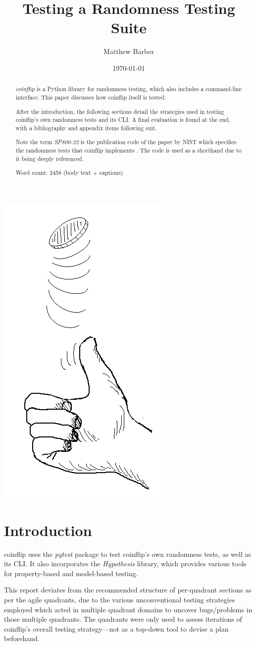\documentclass[11pt]{article}
\author{Matthew Barber}
\date{\today}
\title{Testing a Randomness Testing Suite}
\begin{document}
\maketitle
\vspace*{\fill}

\begin{center}
  \includegraphics[height=.5\linewidth]{./toss.png}
\end{center}

\begin{abstract}
\textit{coinflip} is a Python library for randomness testing, which also includes a command-line interface. This paper discusses how coinflip itself is tested.

After the introduction, the following sections detail the strategies used in testing coinflip's own randomness tests and its CLI. A final evaluation is found at the end, with a bibliography and appendix items following suit.
  
Note the term \textit{SP800-22} is the publication code of the paper by NIST which specifies the randomness tests that coinflip implements \cite{nist}. The code is used as a shorthand due to it being deeply referenced.
  
  Word count: 2458 (body text + captions)
\end{abstract}
\newpage
\tableofcontents
\newpage

\section{Introduction}
\label{sec:org0e0f4cc}
coinflip uses the \textit{pytest} \cite{pytest} package to test coinflip's own randomness tests, as well as its CLI. It also incorporates the \emph{Hypothesis} \cite{hypothesis} library, which provides various tools for property-based and model-based testing.

This report deviates from the recommended structure of per-quadrant sections as per the agile quadrants, due to the various unconventional testing strategies employed which acted in multiple quadrant domains to uncover bugs/problems in those multiple quadrants. The quadrants were only used to assess iterations of coinflip's overall testing strategy---not as a top-down tool to devise a plan beforehand.
\end{document}
